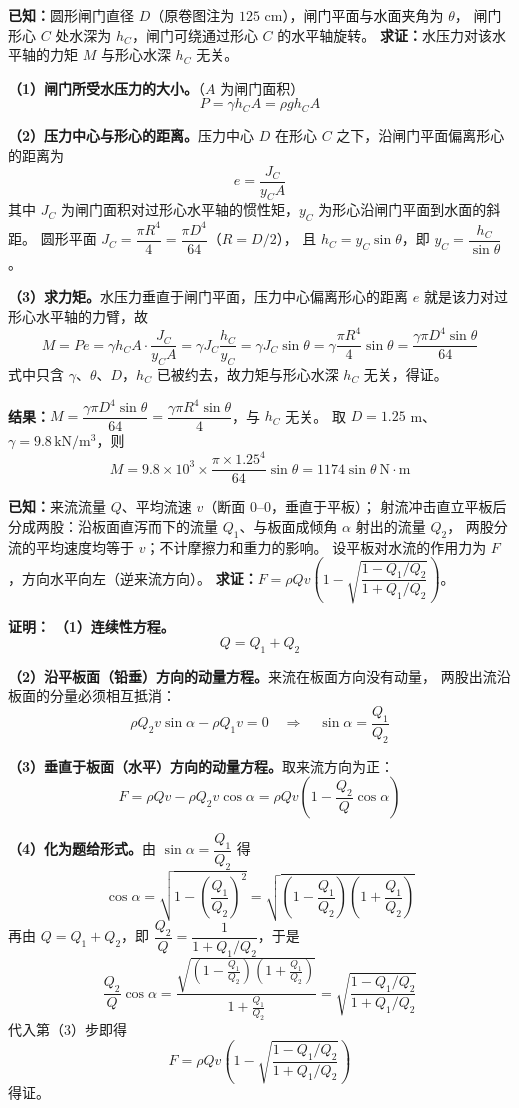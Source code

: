 \begin{jie}
\textbf{已知：}圆形闸门直径 $D$（原卷图注为 $125$ cm），闸门平面与水面夹角为 $\theta$，
闸门形心 $C$ 处水深为 $h_C$，闸门可绕通过形心 $C$ 的水平轴旋转。
\textbf{求证：}水压力对该水平轴的力矩 $M$ 与形心水深 $h_C$ 无关。

\textbf{（1）闸门所受水压力的大小。}（$A$ 为闸门面积）
\[
P=\gamma h_C A=\rho gh_C A
\]

\textbf{（2）压力中心与形心的距离。}压力中心 $D$ 在形心 $C$ 之下，沿闸门平面偏离形心的距离为
\[
e=\frac{J_C}{y_C A}
\]
其中 $J_C$ 为闸门面积对过形心水平轴的惯性矩，$y_C$ 为形心沿闸门平面到水面的斜距。
圆形平面 $J_C=\dfrac{\pi R^{4}}{4}=\dfrac{\pi D^{4}}{64}$（$R=D/2$），
且 $h_C=y_C\sin\theta$，即 $y_C=\dfrac{h_C}{\sin\theta}$。

\textbf{（3）求力矩。}水压力垂直于闸门平面，压力中心偏离形心的距离 $e$ 就是该力对过形心水平轴的力臂，故
\[
M=Pe=\gamma h_C A\cdot\frac{J_C}{y_C A}
=\gamma J_C\frac{h_C}{y_C}
=\gamma J_C\sin\theta
=\gamma\frac{\pi R^{4}}{4}\sin\theta
=\frac{\gamma\pi D^{4}\sin\theta}{64}
\]
式中只含 $\gamma$、$\theta$、$D$，$h_C$ 已被约去，故力矩与形心水深 $h_C$ 无关，得证。

\textbf{结果：}$\boxed{M=\dfrac{\gamma\pi D^{4}\sin\theta}{64}=\dfrac{\gamma\pi R^{4}\sin\theta}{4}}$，与 $h_C$ 无关。
取 $D=1.25$ m、$\gamma=9.8\,\mathrm{kN/m^{3}}$，则
\[
M=9.8\times10^{3}\times\frac{\pi\times1.25^{4}}{64}\sin\theta
=1174\sin\theta\ \mathrm{N\cdot m}
\]
\end{jie}


\begin{jie}
\textbf{已知：}来流流量 $Q$、平均流速 $v$（断面 $0$--$0$，垂直于平板）；
射流冲击直立平板后分成两股：沿板面直泻而下的流量 $Q_1$、与板面成倾角 $\alpha$ 射出的流量 $Q_2$，
两股分流的平均速度均等于 $v$；不计摩擦力和重力的影响。
设平板对水流的作用力为 $F$，方向水平向左（逆来流方向）。
\textbf{求证：}$F=\rho Qv\left(1-\sqrt{\dfrac{1-Q_1/Q_2}{1+Q_1/Q_2}}\right)$。

\textbf{证明：}
\textbf{（1）连续性方程。}
\[
Q=Q_1+Q_2
\]

\textbf{（2）沿平板面（铅垂）方向的动量方程。}来流在板面方向没有动量，
两股出流沿板面的分量必须相互抵消：
\[
\rho Q_2v\sin\alpha-\rho Q_1v=0
\quad\Longrightarrow\quad
\sin\alpha=\frac{Q_1}{Q_2}
\]

\textbf{（3）垂直于板面（水平）方向的动量方程。}取来流方向为正：
\[
F=\rho Qv-\rho Q_2v\cos\alpha
=\rho Qv\left(1-\frac{Q_2}{Q}\cos\alpha\right)
\]

\textbf{（4）化为题给形式。}由 $\sin\alpha=\dfrac{Q_1}{Q_2}$ 得
\[
\cos\alpha=\sqrt{1-\left(\frac{Q_1}{Q_2}\right)^{2}}
=\sqrt{\left(1-\frac{Q_1}{Q_2}\right)\left(1+\frac{Q_1}{Q_2}\right)}
\]
再由 $Q=Q_1+Q_2$，即 $\dfrac{Q_2}{Q}=\dfrac{1}{1+Q_1/Q_2}$，于是
\[
\frac{Q_2}{Q}\cos\alpha
=\frac{\sqrt{\left(1-\frac{Q_1}{Q_2}\right)\left(1+\frac{Q_1}{Q_2}\right)}}{1+\frac{Q_1}{Q_2}}
=\sqrt{\frac{1-Q_1/Q_2}{1+Q_1/Q_2}}
\]
代入第（3）步即得
\[
\boxed{F=\rho Qv\left(1-\sqrt{\frac{1-Q_1/Q_2}{1+Q_1/Q_2}}\right)}
\]
得证。
\end{jie}


